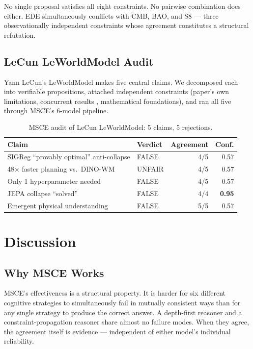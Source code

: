 \documentclass[11pt,a4paper]{article}
\begin{document}
No single proposal satisfies all eight constraints. No pairwise combination does either. EDE simultaneously conflicts with CMB, BAO, and S8 — three observationally independent constraints whose agreement constitutes a structural refutation.

\subsection{LeCun LeWorldModel Audit}

Yann LeCun's LeWorldModel \cite{lecun2026} makes five central claims. We decomposed each into verifiable propositions, attached independent constraints (paper's own limitations, concurrent results \cite{subjepa2026}, mathematical foundations), and ran all five through MSCE's 6-model pipeline.

\begin{table}[ht]
\centering
\begin{tabular}{llrr}
\toprule
\textbf{Claim} & \textbf{Verdict} & \textbf{Agreement} & \textbf{Conf.} \\
\midrule
SIGReg ``provably optimal'' anti-collapse & FALSE & 4/5 & 0.57 \\
48$\times$ faster planning vs.\ DINO-WM & UNFAIR & 4/5 & 0.57 \\
Only 1 hyperparameter needed & FALSE & 4/5 & 0.57 \\
JEPA collapse ``solved'' & FALSE & 4/4 & \textbf{0.95} \\
Emergent physical understanding & FALSE & 5/5 & 0.57 \\
\bottomrule
\end{tabular}
\caption{MSCE audit of LeCun LeWorldModel: 5 claims, 5 rejections.}
\end{table}

\section{Discussion}

\subsection{Why MSCE Works}

MSCE's effectiveness is a structural property. It is harder for six different cognitive strategies to simultaneously fail in mutually consistent ways than for any single strategy to produce the correct answer. A depth-first reasoner and a constraint-propagation reasoner share almost no failure modes. When they agree, the agreement itself is evidence — independent of either model's individual reliability.
\end{document}
